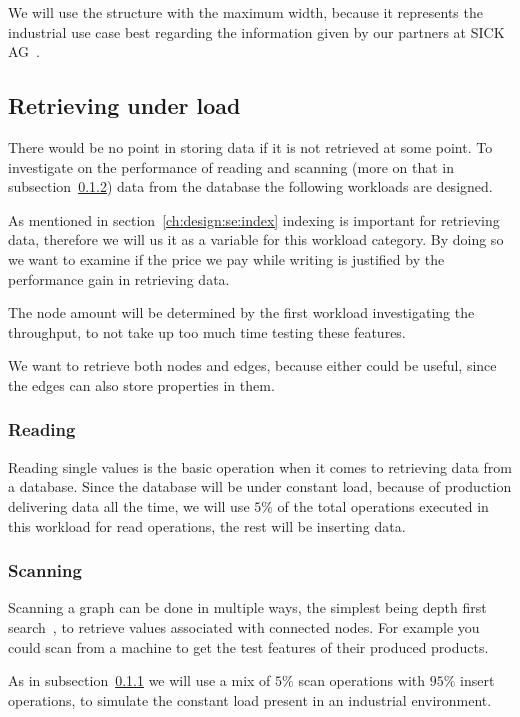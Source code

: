 We will use the structure with the maximum width,
because it represents the industrial use case best regarding the information given by our partners at SICK AG~\cite{SICK}.

\subsection{Retrieving under load}
\label{ch:design:se:retrievingUnderLoad}
There would be no point in storing data if it is not retrieved at some point.
To investigate on the performance of reading and scanning (more on that in subsection~\ref{ch:design:se:scanning}) data from the database the following workloads are designed.

As mentioned in section~\ref{ch:design:se:index} indexing is important for retrieving data,
therefore we will us it as a variable for this workload category.
By doing so we want to examine if the price we pay while writing is justified by the performance gain in retrieving data.

The node amount will be determined by the first workload investigating the throughput,
to not take up too much time testing these features.

We want to retrieve both nodes and edges,
because either could be useful,
since the edges can also store properties in them.

\subsubsection{Reading}
\label{ch:design:se:reading}
Reading single values is the basic operation when it comes to retrieving data from a database.
Since the database will be under constant load,
because of production delivering data all the time,
we will use $ 5\% $ of the total operations executed in this workload for read operations,
the rest will be inserting data.

\subsubsection{Scanning}
\label{ch:design:se:scanning}
Scanning a graph can be done in multiple ways,
the simplest being depth first search~\cite{Tarjan1972},
to retrieve values associated with connected nodes.
For example you could scan from a machine to get the test features of their produced products.

As in subsection~\ref{ch:design:se:reading} we will use a mix of $ 5\% $ scan operations with $ 95\% $ insert operations,
to simulate the constant load present in an industrial environment.

